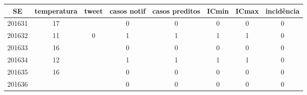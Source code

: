 \begin{tabular}{c|ccccccc}
  \hline
SE & temperatura & tweet & casos notif & casos preditos & ICmin & ICmax & incidência \\ 
  \hline
201631 & 17 &  & 0 & 0 & 0 & 0 & 0 \\ 
  201632 & 11 & 0 & 1 & 1 & 1 & 1 & 0 \\ 
  201633 & 16 &  & 0 & 0 & 0 & 0 & 0 \\ 
  201634 & 12 &  & 1 & 1 & 1 & 1 & 0 \\ 
  201635 & 16 &  & 0 & 0 & 0 & 0 & 0 \\ 
  201636 &  &  & 0 & 0 & 0 & 0 & 0 \\ 
   \hline
\end{tabular}
